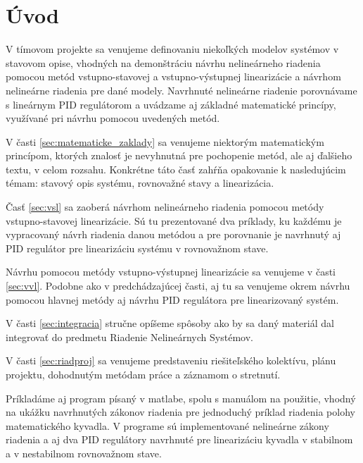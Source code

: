 \newpage
{}
{
	\section{Úvod}
}
{
}

    V tímovom projekte sa venujeme definovaniu niekoľkých modelov systémov v stavovom opise, vhodných na demonštráciu návrhu nelineárneho riadenia pomocou metód vstupno-stavovej a vstupno-výstupnej linearizácie a návrhom nelineárne riadenia pre dané modely. Navrhnuté nelineárne riadenie porovnávame s lineárnym PID regulátorom a uvádzame aj základné matematické princípy, využívané pri návrhu pomocou uvedených metód.

    V časti \ref{sec:matematicke_zaklady} sa venujeme niektorým matematickým princípom, ktorých znalosť je nevyhnutná pre pochopenie metód, ale aj ďalšieho textu, v celom rozsahu. Konkrétne táto časť zahŕňa opakovanie k nasledujúcim témam: stavový opis systému, rovnovažné stavy a linearizácia. 
    
    Časť \ref{sec:vsl} sa zaoberá návrhom nelineárneho riadenia pomocou metódy vstupno-stavovej linearizácie. Sú tu prezentované dva príklady, ku každému je vypracovaný návrh riadenia danou metódou a pre porovnanie je navrhnutý aj PID regulátor pre linearizáciu systému v rovnovažnom stave.

    Návrhu pomocou metódy vstupno-výstupnej linearizácie sa venujeme v časti \ref{sec:vvl}. Podobne ako v predchádzajúcej časti, aj tu sa venujeme okrem návrhu pomocou hlavnej metódy aj návrhu PID regulátora pre linearizovaný systém.

    V časti \ref{sec:integracia} stručne opíšeme spôsoby ako by sa daný materiál dal integrovať do predmetu Riadenie Nelineárnych Systémov.

    V časti \ref{sec:riadproj} sa venujeme predstaveniu riešiteľského kolektívu, plánu projektu, dohodnutým metódam práce a záznamom o stretnutí. 

    Príkladáme aj program písaný v matlabe, spolu s manuálom na použitie, vhodný na ukážku navrhnutých zákonov riadenia pre jednoduchý príklad riadenia polohy matematického kyvadla. V programe sú implementované nelineárne zákony riadenia a aj dva PID regulátory navrhnuté pre linearizáciu kyvadla v stabilnom a v nestabilnom rovnovažnom stave. 


